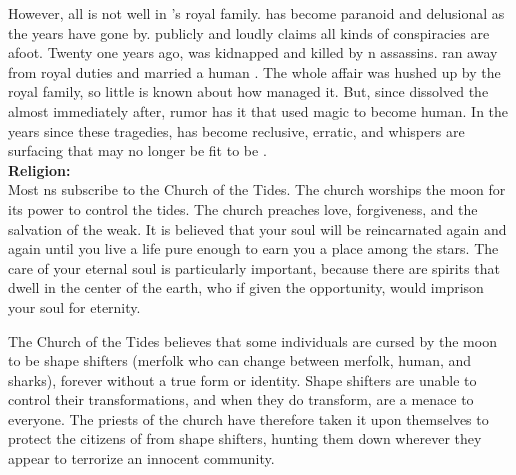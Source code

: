 \documentclass[blue]{NeptuneBall}
\begin{document}
However, all is not well in \pAtlantis{}'s royal family. \cPlant{\Prince} \cPlant{} has become paranoid and delusional as the years have gone by. \cPlant{\They} publicly and loudly claims all kinds of conspiracies are afoot. Twenty one years ago, \cQueen{\King} \cQueen{} was kidnapped and killed by \pPacifica{}n assassins. \cAriel{\Prince} \cAriel{} ran away from \cAriel{\their} royal duties and married a human \cEric{\prince}. The whole affair was hushed up by the royal family, so little is known about how \cAriel{\they{}} managed it. But, since \cKing{} dissolved the \pMagician{} almost immediately after, rumor has it that \cAriel{\they} used magic to become human. In the years since these tragedies, \cKing{} has become reclusive, erratic, and whispers are surfacing that \cKing{\they{}} may no longer be fit to be \cKing{\King}.\\

{\bf Religion:}\\
Most \pAtlantis{}ns subscribe to the Church of the Tides. The church worships the moon for its power to control the tides. The church preaches love, forgiveness, and the salvation of the weak. It is believed that your soul will be reincarnated again and again until you live a life pure enough to earn you a place among the stars. The care of your eternal soul is particularly important, because there are spirits that dwell in the center of the earth, who if given the opportunity, would imprison your soul for eternity.

The Church of the Tides believes that some individuals are cursed by the moon to be shape shifters (merfolk who can change between merfolk, human, and sharks), forever without a true form or identity. Shape shifters are unable to control their transformations, and when they do transform, are a menace to everyone. The priests of the church have therefore taken it upon themselves to protect the citizens of \pAtlantis{} from shape shifters, hunting them down wherever they appear to terrorize an innocent community.\\
\end{document}
